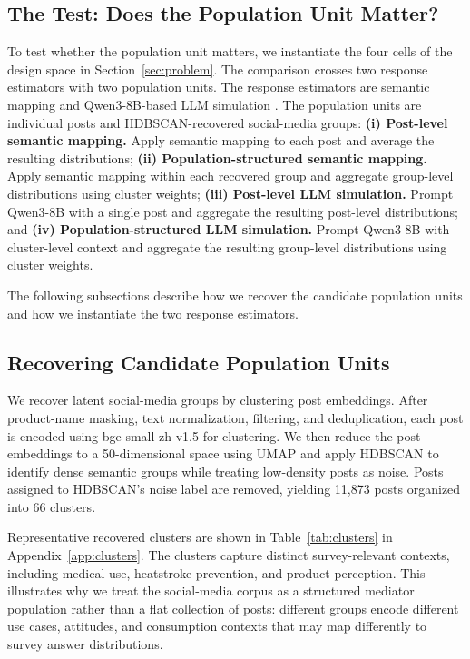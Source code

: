 \documentclass{article}
\begin{document}
\subsection{The Test: Does the Population Unit Matter?}

To test whether the population unit matters, we instantiate the four cells of the design
space in Section~\ref{sec:problem}.
The comparison crosses two response estimators with two population units.
The response estimators are semantic mapping and Qwen3-8B-based LLM simulation \cite{yang2025qwen3}.
The population units are individual posts and HDBSCAN-recovered social-media groups: \textbf{(i) Post-level semantic mapping.} Apply semantic mapping to each post and average the resulting distributions; \textbf{(ii) Population-structured semantic mapping.} Apply semantic mapping within each recovered group and aggregate group-level
distributions using cluster weights; \textbf{(iii) Post-level LLM simulation.} Prompt Qwen3-8B with a single post and aggregate the resulting post-level distributions; and \textbf{(iv) Population-structured LLM simulation.} Prompt Qwen3-8B with cluster-level context and aggregate the resulting group-level distributions using cluster weights.

The following subsections describe how we recover the candidate population units and how
we instantiate the two response estimators.

\subsection{Recovering Candidate Population Units}
\label{cluster_sec}

We recover latent social-media groups by clustering post embeddings.
After product-name masking, text normalization, filtering, and deduplication, each post is
encoded using bge-small-zh-v1.5 \cite{bge_small_zh_v15} for clustering.
We then reduce the post embeddings to a 50-dimensional space using UMAP and apply HDBSCAN
to identify dense semantic groups while treating low-density posts as noise.
Posts assigned to HDBSCAN's noise label are removed, yielding 11,873 posts organized into
66 clusters.

Representative recovered clusters are shown in Table~\ref{tab:clusters} in
Appendix~\ref{app:clusters}.
The clusters capture distinct survey-relevant contexts, including medical use, heatstroke
prevention, and product perception.
This illustrates why we treat the social-media corpus as a structured mediator population
rather than a flat collection of posts: different groups encode different use cases,
attitudes, and consumption contexts that may map differently to survey answer
distributions.
\end{document}
